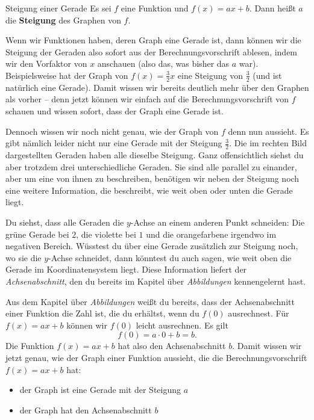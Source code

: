 \documentclass[../../main.tex]{subfiles}
\begin{document}
\begin{definition}{Steigung einer Gerade}
    Es sei $f$ eine Funktion und $f(x)=ax+b$. Dann heißt $a$ die \textbf{Steigung} des Graphen von $f$.
\end{definition}

Wenn wir Funktionen haben, deren Graph eine Gerade ist, dann können wir die Steigung der Geraden also sofort aus der Berechnungsvorschrift ablesen, indem wir den Vorfaktor von $x$ anschauen (also das, was bisher das $a$ war). Beispielsweise hat der Graph von $f(x)=\frac{3}{2}x$ eine Steigung von $\frac{3}{2}$ (und ist natürlich eine Gerade). Damit wissen wir bereits deutlich mehr über den Graphen als vorher -- denn jetzt können wir einfach auf die Berechnungsvorschrift von $f$ schauen und wissen sofort, dass der Graph eine Gerade ist.

Dennoch wissen wir noch nicht genau, wie der Graph von $f$ denn nun aussieht. Es gibt nämlich leider nicht nur eine Gerade mit der Steigung $\frac{3}{2}$. Die im rechten Bild dargestellten Geraden haben alle dieselbe Steigung. Ganz offensichtlich siehst du aber trotzdem drei unterschiedliche Geraden. Sie sind alle parallel zu einander, aber um eine von ihnen zu beschreiben, benötigen wir neben der Steigung noch eine weitere Information, die beschreibt, wie weit oben oder unten die Gerade liegt. 

Du siehst, dass alle Geraden die $y$-Achse an einem anderen Punkt schneiden: Die grüne Gerade bei $2$, die violette bei $1$ und die orangefarbene irgendwo im negativen Bereich. Wüsstest du über eine Gerade zusätzlich zur Steigung noch, wo sie die $y$-Achse schneidet, dann könntest du auch sagen, wie weit oben die Gerade im Koordinatensystem liegt. Diese Information liefert der \emph{Achsenabschnitt}, den du bereits im Kapitel über \emph{Abbildungen} kennengelernt hast.

Aus dem Kapitel über \emph{Abbildungen} weißt du bereits, dass der Achsenabschnitt einer Funktion die Zahl ist, die du erhältst, wenn du $f(0)$ ausrechnest. Für $f(x)=ax+b$ können wir $f(0)$ leicht ausrechnen. Es gilt
\[f(0)=a\cdot 0+b=b.\]
Die Funktion $f(x)=ax+b$ hat also den Achsenabschnitt $b$. Damit wissen wir jetzt genau, wie der Graph einer Funktion aussieht, die die Berechnungsvorschrift $f(x)=ax+b$ hat:
\begin{itemize}
    \item der Graph ist eine Gerade mit der Steigung $a$
    \item der Graph hat den Achsenabschnitt $b$
\end{itemize}
\end{document}

